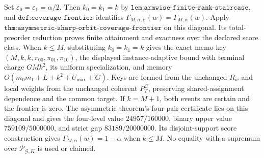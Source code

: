 Set \(\varepsilon_0=\varepsilon_1=\alpha/2\). Then \(k_0=k_1=k\) by \(\texttt{lem:armwise-finite-rank-staircase}\), and \(\texttt{def:coverage-frontier}\) identifies \(\Gamma_{M,\alpha,\boldsymbol\varepsilon}(w)=\Gamma_{M,\alpha}(w)\). Apply \(\texttt{thm:asymmetric-sharp-orbit-coverage-frontier}\) on this diagonal. Its total-preorder reduction proves finite attainment and exactness over the declared score class. When \(k\le M\), substituting \(k_0=k_1=k\) gives the exact memo key \((M,k,k,\pi_{00},\pi_{01},\pi_{10})\), the displayed instance-adaptive bound with terminal charge \(GMk^2\), its uniform specialization, and memory \(O(m_0m_1+L+k^2+U_{\max}+G)\). Keys are formed from the unchanged \(R_w\) and local weights from the unchanged coherent \(P_T^C\), preserving shared-assignment dependence and the common target. If \(k=M+1\), both events are certain and the frontier is zero. The asymmetric theorem's four-pair certificate lies on this diagonal and gives the four-level value \(24957/160000\), binary upper value \(759109/5000000\), and strict gap \(83189/20000000\). Its disjoint-support score construction gives \(\Gamma_{M,\alpha}(w)=1-\alpha\) when \(k\le M\). No equality with a supremum over \(\mathcal P_{\mathcal G,K}\) is used or claimed.